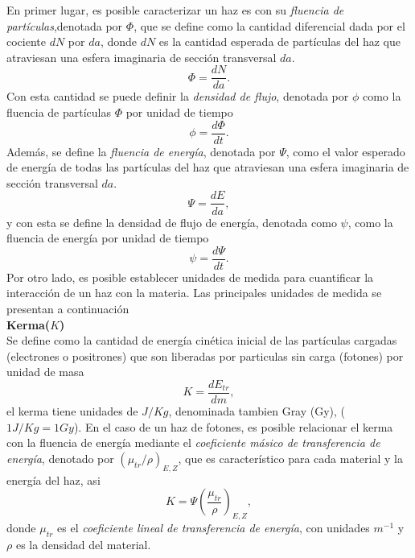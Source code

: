 En primer lugar, es posible caracterizar un haz es con su \textit{fluencia de partículas},denotada por $\Phi $, que se define como la cantidad diferencial dada por el cociente $dN$ por $da$, donde $dN$ es la cantidad esperada de partículas del haz que atraviesan una esfera imaginaria de sección transversal $da$.
\begin{equation}
	\Phi=\frac{dN}{da}.
\end{equation}   
Con esta cantidad se puede definir la \textit{densidad de flujo}, denotada por $\phi$ como la fluencia de partículas $\Phi$ por unidad de tiempo
\begin{equation}
	\phi=\frac{d\Phi}{dt}.
\end{equation}
Además, se define la \textit{fluencia de energía}, denotada por $\Psi$, como el valor esperado de energía de todas las partículas del haz que atraviesan una esfera imaginaria de sección transversal $da$.
\begin{equation}
	\Psi=\frac{dE}{da},
\end{equation}
y con esta se define la densidad de flujo de energía, denotada como $\psi$, como la fluencia de energía por unidad de tiempo
\begin{equation}
	\psi=\frac{d\Psi}{dt}.
\end{equation}
Por otro lado, es posible establecer unidades de medida para cuantificar la interacción de un haz con la materia. Las principales unidades de medida se presentan a continuación\\

\noindent
\textbf{Kerma($K$)}\\

Se define como la cantidad de energía cinética inicial de las partículas cargadas (electrones o positrones) que son liberadas por particulas sin carga (fotones) por unidad de masa
\begin{equation}
	K=\frac{dE_{tr}}{dm},
\end{equation}
el kerma tiene unidades de $J/Kg$, denominada tambien Gray (Gy), ($1J/Kg=1Gy$).
En el caso de un haz de fotones, es posible relacionar el kerma con la fluencia de energía mediante el \textit{coeficiente másico de transferencia de energía}, denotado por $(\mu_{tr}/\rho)_{E,Z}$, que es característico para cada material y la energía del haz, asi
\begin{equation}
	K=\Psi \left(\frac{\mu_{tr}}{\rho}\right)_{E,Z},
\end{equation} 
donde $\mu_{tr}$ es el \textit{coeficiente lineal de transferencia de energía}, con unidades $m^{-1}$ y $\rho$ es la densidad del material.\\

